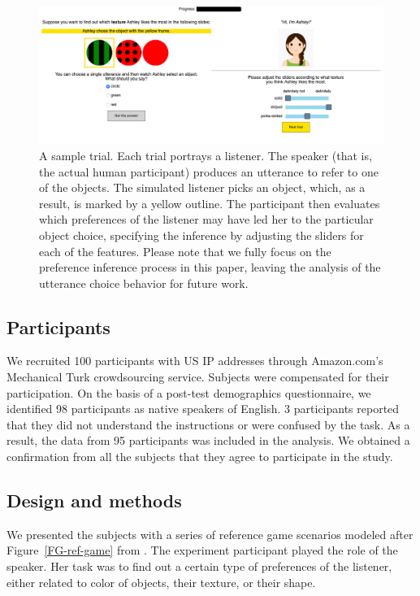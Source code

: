 \documentclass[10pt,a4paper]{article}
\begin{document}
\begin{figure}[ht!]
	\centering
	\includegraphics[width=5.5in]{images/trial.png}
	\caption{ \small{A sample trial. Each trial portrays a listener. The speaker (that is, the actual human participant) produces an utterance to refer to one of the objects. The simulated listener picks an object, which, as a result, is marked by a yellow outline. The participant then evaluates which preferences of the listener may have led her to the particular object choice, specifying the inference by adjusting the sliders for each of the features. Please note that we fully focus on the preference inference process in this paper, leaving the analysis of the utterance choice behavior for future work.} }
	\label{exp1-trial}
\end{figure}



\subsection{Participants}

We recruited 100 participants with US IP addresses through Amazon.com's Mechanical Turk crowdsourcing service. Subjects were compensated for their participation. On the basis of a post-test demographics questionnaire, we identified 98 participants as native speakers of English. 3 participants reported that they did not understand the instructions or were confused by the task. As a result, the data from 95 participants was included in the analysis. We obtained a confirmation from all the subjects that they agree to participate in the study.


\subsection{Design and methods}

We presented the subjects with a series of reference game scenarios modeled after Figure~\ref{FG-ref-game} from . The experiment participant played the role of the speaker. Her task was to find out a certain type of preferences of the listener, either related to color of objects, their texture, or their shape. 
\end{document}
